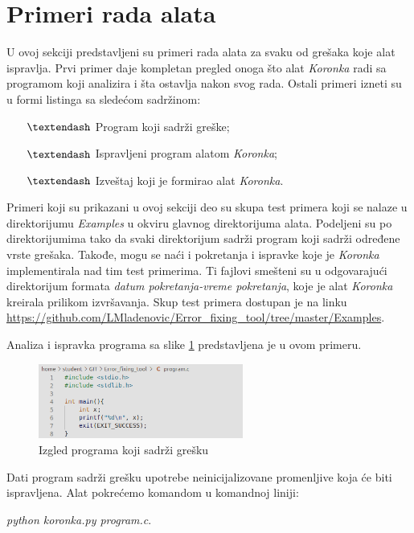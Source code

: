 \documentclass[12pt,oneside]{memoir}
\theoremstyle{plain}
\theoremstyle{definition}
\begin{document}
\section{Primeri rada alata}
U ovoj sekciji predstavljeni su primeri rada alata za svaku od grešaka koje alat ispravlja. Prvi primer daje kompletan pregled onoga što alat \textit{Koronka} radi sa programom koji analizira i šta ostavlja nakon svog rada. Ostali primeri izneti su u formi listinga sa sledećom sadržinom:
\begin{itemize}
\item[$\textendash$] Program koji sadrži greške;
\item[$\textendash$] Ispravljeni program alatom \textit{Koronka};
\item[$\textendash$] Izveštaj koji je formirao alat \textit{Koronka}.
\end{itemize} 

Primeri koji su prikazani u ovoj sekciji deo su skupa test primera koji se nalaze u direktorijumu \textit{Examples} u okviru glavnog direktorijuma alata. Podeljeni su po direktorijumima tako da svaki direktorijum sadrži program koji sadrži određene vrste grešaka. Takođe, mogu se naći i pokretanja i ispravke koje je \textit{Koronka} implementirala nad tim test primerima. Ti fajlovi smešteni su u odgovarajući direktorijum formata \textit{datum pokretanja-vreme pokretanja}, koje je alat \textit{Koronka} kreirala prilikom izvršavanja. Skup test primera dostupan je na linku \url{https://github.com/LMladenovic/Error_fixing_tool/tree/master/Examples}.  

Analiza i ispravka programa sa slike \ref{fig:slika4.15} predstavljena je u ovom primeru. 

\begin{figure}[!ht]
  \centering
  \includegraphics[width=0.6\textwidth]{ProgramWithError.png}
  \caption{Izgled programa koji sadrži grešku}
  \label{fig:slika4.15}
\end{figure}

Dati program sadrži grešku upotrebe neinicijalizovane promenljive koja će biti ispravljena. Alat pokrećemo komandom u komandnoj liniji:
\begin{center}
\textit{python koronka.py program.c}.
\end{center}
\end{document}
